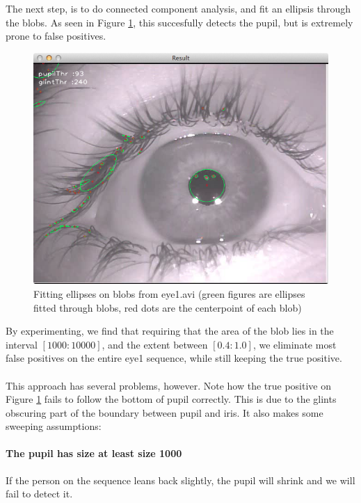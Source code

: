 \documentclass[a4paper,11pt]{article}
\begin{document}
The next step, is to do connected component analysis, and fit an ellipsis through the blobs. As seen in Figure \ref{fig:eye1_unfiltered}, this succesfully detects the pupil, but is extremely prone to false positives.

\begin{figure}[ht]
  \centering
  \includegraphics[scale=0.3]{eye1_unfiltered}
  \caption{Fitting ellipses on blobs from eye1.avi (green figures are ellipses fitted through blobs, red dots are the centerpoint of each blob)}
  \label{fig:eye1_unfiltered}
\end{figure}

By experimenting, we find that requiring that the area of the blob lies in the interval $[1000:10000]$, and the extent between $[0.4:1.0]$, we eliminate most false positives on the entire eye1 sequence, while still keeping the true positive.

\paragraph{}
This approach has several problems, however. Note how the true positive on Figure \ref{fig:eye1_unfiltered} fails to follow the bottom of pupil correctly. This is due to the glints obscuring part of the boundary between pupil and iris. It also makes some sweeping assumptions:

\paragraph{The pupil has size at least size 1000}
If the person on the sequence leans back slightly, the pupil will shrink and we will fail to detect it.
\end{document}
